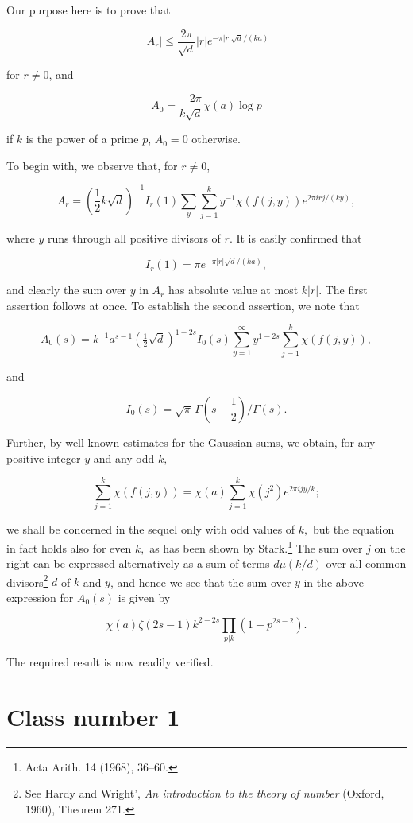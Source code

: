 Our purpose here is to prove that

\[\left|A_r\right|\le \frac{2\pi}{\sqrt{d}}\left|r\right|e^{-\pi|r|\sqrt{d}/(ka)}\]

for $r \neq 0$, and

\[A_0 = \frac{-2\pi}{k\sqrt{d}} \chi(a) \log p\]

if $k$ is the power of a prime $p$, $A_0 = 0$ otherwise.

To begin with, we observe that, for $r \neq 0$,

\[A_r = (\frac{1}{2}k\sqrt{d})^{-1}I_r(1)\sum_{y}\sum_{j=1}^k y^{-1}\chi(f(j,y))e^{2\pi i r j/(ky)},\]

where $y$ runs through all positive divisors of $r$. It is easily confirmed that

\[ I_r(1) = \pi e^{-\pi |r| \sqrt{d}/(ka)}, \]

and clearly the sum over $y$ in $A_r$ has absolute value at most $k|r|$. The first assertion follows at once. To establish the second assertion, we note that

\[A_0(s) = k^{-1}a^{s-1}(\tfrac{1}{2}\sqrt{d})^{1-2s}I_0(s)\sum_{y=1}^{\infty}y^{1-2s}\sum_{j=1}^k\chi(f(j,y)),\]

and

\[I_0(s) = \sqrt{\pi} \, \Gamma(s - \frac{1}{2}) / \Gamma(s).\]

Further, by well-known estimates for the Gaussian sums, we obtain, for any positive integer $y$ and any odd $k,$

\[\sum_{j=1}^{k} \chi(f(j,y)) = \chi(a) \sum_{j=1}^{k} \chi(j^{2}) e^{2\pi i j y/k};\]

we shall be concerned in the sequel only with odd values of $k,$ but the equation in fact holds also for even $k,$ as has been shown by Stark.\footnote{Acta Arith. 14 (1968), 36--60.} The sum over $j$ on the right can be expressed alternatively as a sum of terms $d \mu(k/d)$ over all common divisors\footnote{See Hardy and Wright', \textit{An introduction to the theory of number} (Oxford, 1960),
Theorem 271.} $d$ of $k$ and $y$, and hence we see that the sum over $y$ in the above expression for $A_0(s)$ is given by

\[\chi(a) \zeta(2s-1) k^{2-2s} \prod_{p|k} (1-p^{2s-2}).\]

The required result is now readily verified.

\section{Class number 1}\label{sec:ch5_4}

